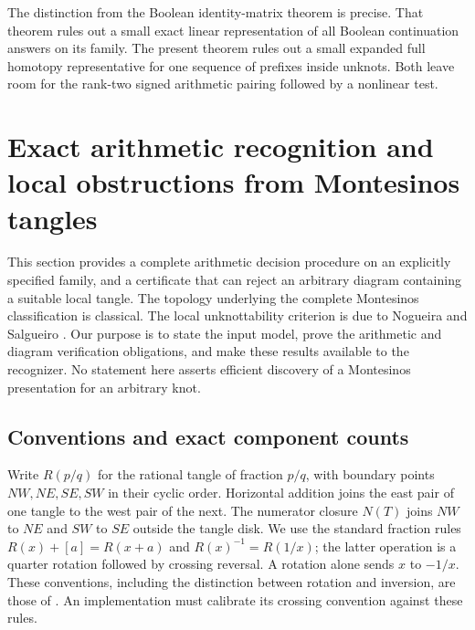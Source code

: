\documentclass[11pt,a4paper]{article}
\theoremstyle{definition}
\theoremstyle{remark}
\numberwithin{equation}{section}
\begin{document}
The distinction from the Boolean identity-matrix theorem is precise.
That theorem rules out a small exact linear representation of all
Boolean continuation answers on its family.  The present theorem
rules out a small expanded full homotopy representative for one
sequence of prefixes inside unknots.  Both leave room for the
rank-two signed arithmetic pairing followed by a nonlinear test.


\section{Exact arithmetic recognition and local obstructions from Montesinos tangles}
\label{sec:mon:montesinos}

This section provides a complete arithmetic decision procedure on an explicitly
specified family, and a certificate that can reject an arbitrary diagram
containing a suitable local tangle.  The topology underlying the complete
Montesinos classification is classical.  The local unknottability criterion is
due to Nogueira and Salgueiro \cite[Theorem~4.9]{nogueira-salgueiro}.
Our purpose is to state the input model, prove the arithmetic and diagram
verification obligations, and make these results available to the recognizer.
No statement here asserts efficient discovery of a Montesinos presentation for
an arbitrary knot.

\subsection{Conventions and exact component counts}

Write $R(p/q)$ for the rational tangle of fraction $p/q$, with boundary points
$NW,NE,SE,SW$ in their cyclic order.  Horizontal addition joins the east pair
of one tangle to the west pair of the next.  The numerator closure $N(T)$ joins
$NW$ to $NE$ and $SW$ to $SE$ outside the tangle disk.  We use the standard
fraction rules $R(x)+[a]=R(x+a)$ and $R(x)^{-1}=R(1/x)$; the latter operation
is a quarter rotation followed by crossing reversal.  A rotation alone sends
$x$ to $-1/x$.  These conventions, including the distinction between rotation
and inversion, are those of \cite[Section~2]{kauffman-lambropoulou-tangles}.
An implementation must calibrate its crossing convention against these rules.
\end{document}
